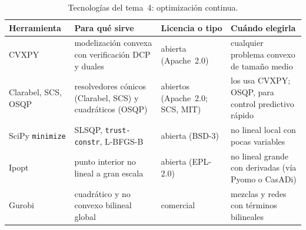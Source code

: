 \begin{table}[h]
\centering\small
\caption{Tecnologías del tema~4: optimización continua.}\label{tab:tec4}
\begin{tabularx}{\textwidth}{@{}l>{\raggedright\arraybackslash}X>{\raggedright\arraybackslash}p{2.2cm}>{\raggedright\arraybackslash}X@{}}
\toprule
Herramienta & Para qué sirve & Licencia o tipo & Cuándo elegirla \\
\midrule
CVXPY~\cite{cvxpy} & modelización convexa con verificación DCP y duales & abierta (Apache~2.0) & cualquier problema convexo de tamaño medio \\
Clarabel, SCS, OSQP & resolvedores cónicos (Clarabel, SCS) y cuadráticos (OSQP) & abiertos (Apache~2.0; SCS, MIT) & los usa CVXPY; OSQP, para control predictivo rápido \\
SciPy \texttt{minimize} & SLSQP, \texttt{trust-constr}, L-BFGS-B & abierta (BSD-3) & no lineal local con pocas variables \\
Ipopt & punto interior no lineal a gran escala & abierta (EPL-2.0) & no lineal grande con derivadas (vía Pyomo o CasADi) \\
Gurobi & cuadrático y no convexo bilineal global & comercial & mezclas y redes con términos bilineales \\
\bottomrule
\end{tabularx}
\end{table}

\addtocounter{definicion}{1}%

